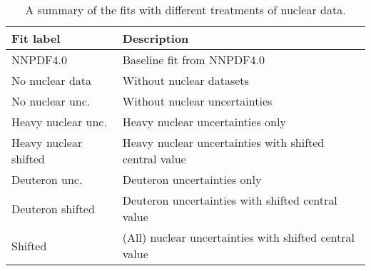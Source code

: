 \begin{table}[h]
  \centering
  \scriptsize
  \renewcommand{\arraystretch}{1.13}
  \begin{tabularx}{0.8\textwidth}{lX}
    \toprule
    {\bf Fit label }     & { \bf Description }\\
    \midrule
    NNPDF4.0    & Baseline fit from NNPDF4.0 \\
    No nuclear data & Without nuclear datasets \\
    No nuclear unc. & Without nuclear uncertainties \\
    Heavy nuclear unc. & Heavy nuclear uncertainties only \\
    Heavy nuclear shifted & Heavy nuclear uncertainties with shifted central value \\
    Deuteron unc. & Deuteron uncertainties only \\
    Deuteron shifted & Deuteron uncertainties with shifted central value \\
    Shifted & (All) nuclear uncertainties with shifted central value \\  
    \bottomrule
  \end{tabularx}
  \caption{A summary of the fits with different treatments of nuclear data.}
  \label{tab:fits-unc}
\end{table}

